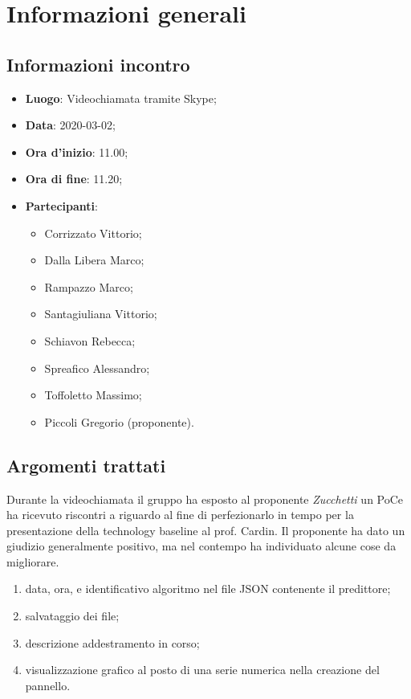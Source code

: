 \section{Informazioni generali}
    \subsection{Informazioni incontro}
        \begin{itemize}
            \item \textbf{Luogo}: Videochiamata tramite Skype;
            \item \textbf{Data}: 2020-03-02;
            \item \textbf{Ora d'inizio}: 11.00;
            \item \textbf{Ora di fine}: 11.20;
            \item \textbf{Partecipanti}: 
            \begin{itemize}
                \item Corrizzato Vittorio;
                \item Dalla Libera Marco;
                \item Rampazzo Marco;
                \item Santagiuliana Vittorio;
                \item Schiavon Rebecca;
                \item Spreafico Alessandro;
                \item Toffoletto Massimo;
                \item Piccoli Gregorio (proponente).
            \end{itemize}
        \end{itemize}
    \subsection{Argomenti trattati}
        Durante la videochiamata il gruppo ha esposto al proponente \textit{Zucchetti} un PoC\glosp e ha ricevuto riscontri a riguardo al fine di perfezionarlo in tempo per la presentazione della technology baseline al prof. Cardin.
        Il proponente ha dato un giudizio generalmente positivo, ma nel contempo ha individuato alcune cose da migliorare.
        \begin{enumerate}
            \item data, ora, e identificativo algoritmo nel file JSON contenente il predittore;
            \item salvataggio dei file;
            \item descrizione addestramento in corso;
            \item visualizzazione grafico al posto di una serie numerica nella creazione del pannello.  
        \end{enumerate}
